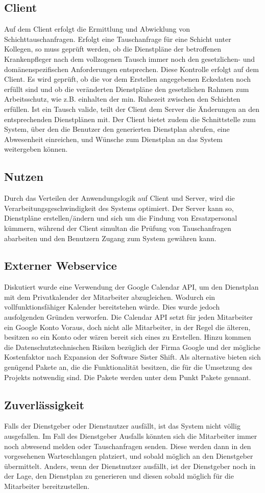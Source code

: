 \documentclass[11pt,
paper=a4,
bibtotocnumbered,	  %
liststotocnumbered,  %
DIV=calc,		  %
tablecaptionabove,	  %
headinclude,
]{article}
\begin{document}
\subsection{Client}
Auf dem Client erfolgt die Ermittlung und Abwicklung von Schichttauschanfragen. Erfolgt eine Tauschanfrage für eine Schicht unter Kollegen, so muss geprüft werden, ob die Dienstpläne der betroffenen Krankenpfleger nach dem vollzogenen Tausch immer noch den gesetzlichen- und domänenspezifischen Anforderungen entsprechen. Diese Kontrolle erfolgt auf dem Client. Es wird geprüft, ob die vor dem Erstellen angegebenen Eckedaten noch erfüllt sind und ob die veränderten Dienstpläne den gesetzlichen Rahmen zum Arbeitsschutz, wie z.B. einhalten der min. Ruhezeit zwischen den Schichten erfüllen. Ist ein Tausch valide, teilt der Client dem Server die Änderungen an den entsprechenden Dienstplänen mit. Der Client bietet zudem die Schnittstelle zum System, über den die Benutzer den generierten Dienstplan abrufen, eine Abwesenheit einreichen, und Wünsche zum Dienstplan an das System weitergeben können. 
\subsection{Nutzen}
Durch das Verteilen der Anwendungslogik auf Client und Server, wird die Verarbeitungsgeschwindigkeit des Systems optimiert. Der Server kann so, Dienstpläne erstellen/ändern und sich um die Findung von Ersatzpersonal kümmern, während der Client simultan die Prüfung von Tauschanfragen abarbeiten und den Benutzern Zugang zum System gewähren kann.
\subsection{Externer Webservice}
Diskutiert wurde eine Verwendung der Google Calendar API, um den Dienstplan mit dem Privatkalender der Mitarbeiter abzugleichen. Wodurch ein vollfunktionsfähiger Kalender bereitstehen würde. Dies wurde jedoch ausfolgenden Gründen verworfen. Die Calendar API setzt für jeden Mitarbeiter ein Google Konto Voraus, doch nicht alle Mitarbeiter, in der Regel die älteren, besitzen so ein Konto oder wären bereit sich eines zu Erstellen. Hinzu kommen die Datenschutztechnischen Risiken bezüglich der Firma Google und der mögliche Kostenfaktor nach Expansion der Software Sister Shift. Als alternative bieten sich genügend Pakete an, die die Funktionalität besitzen, die für die Umsetzung des Projekts notwendig sind. Die Pakete werden unter dem Punkt Pakete gennant.
\subsection{Zuverlässigkeit}
Falls der Dienstgeber oder Dienstnutzer ausfällt, ist das System nicht völlig ausgefallen. Im Fall des Dienstgeber Ausfalls könnten sich die Mitarbeiter immer noch abwesend melden oder Tauschanfragen senden. Diese werden dann in den vorgesehenen Warteschlangen platziert, und sobald möglich an den Dienstgeber übermittelt. Anders, wenn der Dienstnutzer ausfällt, ist der Dienstgeber noch in der Lage, den Dienstplan zu generieren und diesen sobald möglich für die Mitarbeiter bereitzustellen. 
\end{document}
